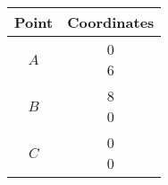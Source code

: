 \begin{tabular}{|c|c|}
        \hline
        Point & Coordinates\\
        \hline
        $A$ & \myvec{0\\6}\\
        \hline
        $B$ & \myvec{8\\0}\\
        \hline
        $C$ & \myvec{0\\0}\\
        \hline
\end{tabular}
